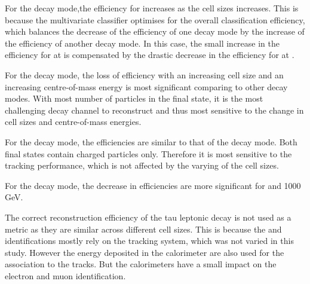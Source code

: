 
For the \decayRhoShort decay mode,the efficiency for   increases as the cell sizes increases. This is because the multivariate classifier optimises for the overall classification efficiency, which balances the decrease of the efficiency of one decay mode by the increase of the efficiency of another decay mode. In this case, the small increase in the efficiency for \decayRhoShort at  is compensated by the drastic decrease in the efficiency for \decayAiPhotonShort at  .

For the \decayAiPhotonShort decay mode, the loss of efficiency with an increasing \ECAL  cell size and an increasing centre-of-mass energy is most significant comparing to other decay modes. With most number of particles in the final state, it is the most challenging decay channel to reconstruct and thus most sensitive to the change in cell sizes and centre-of-mass energies.

For the \decayAiPionShort decay mode, the efficiencies are similar to that of the \decayPionShort decay mode. Both final states contain charged particles only. Therefore it is most sensitive to the tracking performance, which is not affected by the  varying of the \ECAL cell sizes.

For the \decayThreePionPhotonShort decay mode, the decrease in efficiencies are more significant for  and 1000\,GeV.

The   correct reconstruction efficiency of the tau leptonic decay is not used as a metric as they are similar across different \ECAL cell sizes. This is because the \Pepm and \Pgmpm identifications mostly rely on the tracking system, which was not varied in this study. However the energy deposited in the calorimeter are also used for the association to the tracks. But the calorimeters have a small impact on the electron and  muon identification.

